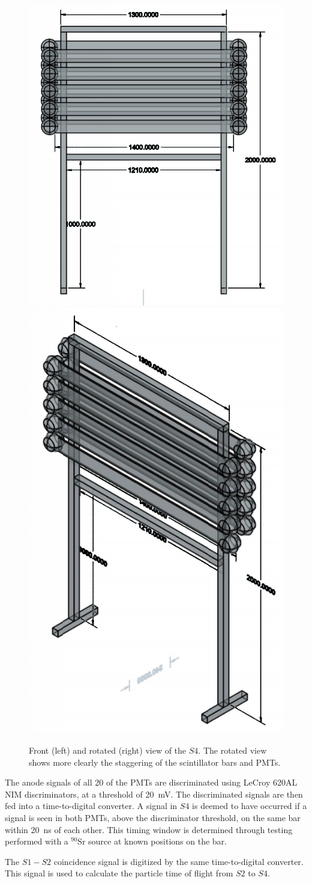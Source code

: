 \begin{figure}[ht]    
  \centering
  \includegraphics[width=0.5\linewidth]{files/Figures/dstofFront2.png}
  \hfill
  \includegraphics[width=0.35\linewidth]{files/Figures/dstofDiag2.png}
  \caption{Front (left) and rotated (right) view of the $\mathit{S4}$. The rotated view shows more clearly the staggering of the scintillator bars and PMTs.}
  \label{fig:dstofDiagram}
\end{figure}

The anode signals of all 20 of the PMTs are discriminated using LeCroy 620AL NIM discriminators, at a threshold of 20~mV.
The discriminated signals are then fed into a time-to-digital converter. A signal in $\mathit{S4}$ is deemed to have occurred if a signal is seen in both PMTs, above the discriminator threshold, on the same bar within 20~ns of each other. 
This timing window is determined through testing performed with a $^{90}$Sr source at known positions on the bar.

The $\mathit{S1-S2}$ coincidence signal is digitized by the same time-to-digital converter. This signal is used to calculate the particle time of flight from $\mathit{S2}$ to $\mathit{S4}$.

